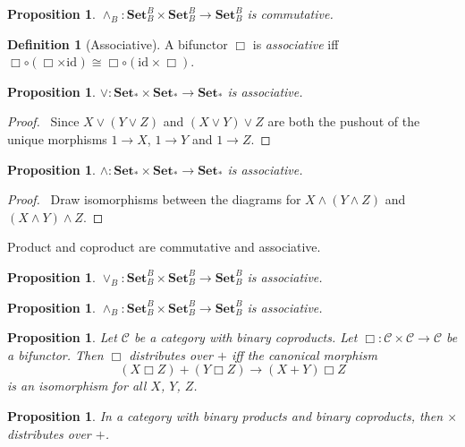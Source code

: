 \documentclass{book}
\let\qed\relax
\newtheorem{prop}[ax]{Proposition}
\theoremstyle{definition}
\newtheorem{df}[ax]{Definition}
\newcommand{\id}[1]{\ensuremath{\mathrm{id}_{#1}}}
\newcommand{\Set}{\ensuremath{\mathbf{Set}}}
\begin{document}
\begin{prop}
$\wedge_B : \Set_B^B \times \Set_B^B \rightarrow \Set_B^B$ is commutative.
\end{prop}

\begin{df}[Associative]
A bifunctor $\Box$ is \emph{associative} iff $\Box \circ (\Box \times \id{}) \cong \Box \circ (\id{} \times \Box)$.
\end{df}

\begin{prop}
$\vee : \Set_* \times \Set_* \rightarrow \Set_*$ is associative.
\end{prop}

\begin{proof}
\pf\ Since $X \vee (Y \vee Z)$ and $(X \vee Y) \vee Z$ are both the pushout of the unique morphisms $1 \rightarrow X$, $1 \rightarrow Y$ and $1 \rightarrow Z$. \qed
\end{proof}

\begin{prop}
$\wedge : \Set_* \times \Set_* \rightarrow \Set_*$ is associative.
\end{prop}

\begin{proof}
\pf\ Draw isomorphisms between the diagrams for $X \wedge (Y \wedge Z)$ and $(X \wedge Y) \wedge Z$. \qed
\end{proof}

Product and coproduct are commutative and associative.

\begin{prop}
$\vee_B : \Set_B^B \times \Set_B^B \rightarrow \Set_B^B$ is associative.
\end{prop}

\begin{prop}
$\wedge_B : \Set_B^B \times \Set_B^B \rightarrow \Set_B^B$ is associative.
\end{prop}

\begin{prop}
Let $\mathcal{C}$ be a category with binary coproducts. Let $\Box : \mathcal{C} \times \mathcal{C} \rightarrow \mathcal{C}$ be a bifunctor. Then $\Box$ \emph{distributes} over $+$ iff the canonical morphism
\[ (X \Box Z) + (Y \Box Z) \rightarrow (X + Y) \Box Z \]
is an isomorphism for all $X$, $Y$, $Z$.
\end{prop}

\begin{prop}
In a category with binary products and binary coproducts, then $\times$ distributes over $+$.
\end{prop}
\end{document}
